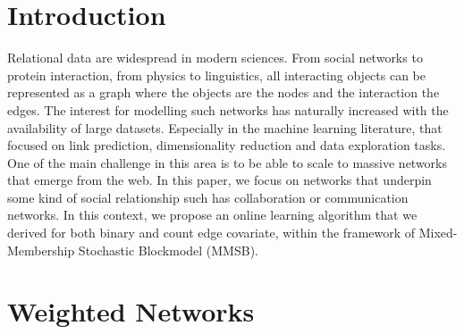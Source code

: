 \section{Introduction}

Relational data are widespread in modern sciences. From social networks to protein interaction, from physics to linguistics, all interacting objects can be represented as a graph where the objects are the nodes and the interaction the edges. The interest for modelling such networks has naturally increased with the availability of large datasets. Especially in the machine learning literature, that focused on link prediction, dimensionality reduction and data exploration tasks. One of the main challenge in this area is to be able to scale to massive networks that emerge from the web. In this paper, we focus on networks that underpin some kind of social relationship such has collaboration or communication networks. In this context, we propose an online learning algorithm that we derived for both binary and count edge covariate, within the framework of Mixed-Membership Stochastic Blockmodel (MMSB).



\section{Weighted Networks}

